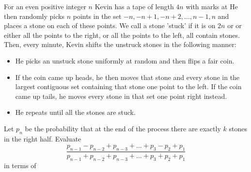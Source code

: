 For an even positive integer $n$ Kevin has a tape of length $4n$ with marks at   He then randomly picks $n$ points in the set $-n,-n+1,-n+2,\ldots,n-1,n$ and places a stone on each of these points.  We call a stone 'stuck' if it is on $2n$ or  or either all the points to the right, or all the points to the left, all contain stones.  Then, every minute, Kevin shifts the unstruck stones in the following manner:
\begin{itemize}
	\item He picks an unstuck stone uniformly at random and then flips a fair coin.
	\item If the coin came up heads, he then moves that stone and every stone in the largest contiguous set containing that stone one point to the left. If the coin came up tails, he moves every stone in that set one point right instead.
	\item He repeats until all the stones are stuck.
\end{itemize}
Let $p_n$ be the probability that at the end of the process there are exactly $k$ stones in the right half.  Evaluate \[\dfrac{p_{n-1}-p_{n-2}+p_{n-3}+\ldots+p_3-p_2+p_1}{p_{n-1}+p_{n-2}+p_{n-3}+\ldots+p_3+p_2+p_1}\] in terms of 